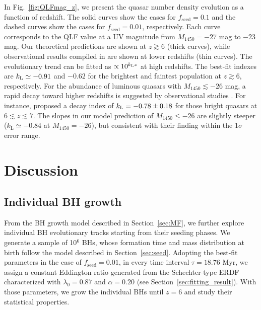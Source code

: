 \documentclass[twocolumn, twocolappendix]{aastex63}
\newcommand{\tlife}{\tau}
\newcommand{\fseed}{f_\mathrm{seed}}
\newcommand{\Muv}{M_{1450}}
\begin{document}
\begin{CJK*}{UTF8}{gbsn}
In Fig.~\ref{fig:QLFmag_z}, we present the quasar number density evolution as a function of redshift.
The solid curves show the cases for $\fseed = 0.1$ and the dashed curves show the cases for $\fseed = 0.01$, respectively.
Each curve corresponds to the QLF value at a UV magnitude from $\Muv=-27$ mag to $-23$ mag.
Our theoretical predictions are shown at $z\gtrsim 6$ (thick curves),
while observational results compiled in \cite{2020ApJ...904...89N} are shown at lower redshifts (thin curves).
The evolutionary trend can be fitted as $\propto 10^{k_{\rm L}z}$ at high redshifts.
The best-fit indexes are $k_{\rm L}\simeq -0.91$ and $-0.62$ for the brightest and faintest population
at $z\gtrsim 6$, respectively.
For the abundance of luminous quasars with $\Muv \lesssim -26$ mag, a rapid decay toward higher redshifts is suggested by
observational studies \citep[e.g.,][]{2001AJ....122.2833F,2013ApJ...768..105M,2016ApJ...833..222J,2019ApJ...884...30W}.
For instance, \citet{2019ApJ...884...30W} proposed a decay index of $k_{\rm L}=-0.78\pm{0.18}$ for those bright quasars at $6\lesssim z \lesssim 7$.
The slopes in our model prediction of $\Muv\leq -26$ are slightly steeper ($k_\mathrm{L} \simeq -0.84$ at $\Muv=-26$),
but consistent with their finding within the $1\sigma$ error range.


\vspace{2mm}
\section{Discussion}\label{sec:discussion}
\vspace{2mm}
\subsection{Individual BH growth}\label{sec:evol}

From the BH growth model described in Section~\ref{sec:MF}, we further explore individual BH evolutionary tracks starting from their seeding phases.
We generate a sample of 10$^6$ BHs, whose formation time and mass distribution at birth follow the model described in Section~\ref{sec:seed}. 
Adopting the best-fit parameters in the case of $\fseed = 0.01$, in every time interval $\tlife=18.76$ Myr,
we assign a constant Eddington ratio generated from the Schechter-type ERDF characterized with $\lambda_0=0.87$ and $\alpha=0.20$ 
(see Section~\ref{sec:fitting_result}).
With those parameters, we grow the individual BHs until $z=6$ and study their statistical properties.



\end{CJK*}
\end{document}
